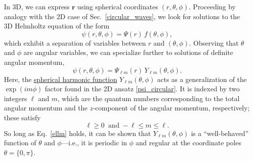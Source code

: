\documentclass[pra,12pt]{revtex4-2}
\begin{document}
In 3D, we can express $\mathbf{r}$ using spherical coordinates $(r,
\theta, \phi)$.  Proceeding by analogy with the 2D case of
Sec.~\ref{circular_waves}, we look for solutions to the 3D Helmholtz
equation of the form
\begin{equation}
  \psi(r,\theta,\phi) = \Psi(r) \, f(\theta, \phi),
  \label{psi3d0}
\end{equation}
which exhibit a separation of variables between $r$ and
$(\theta,\phi)$.  Observing that $\theta$ and $\phi$ are angular
variables, we can specialize further to solutions of definite angular
momentum,
\begin{equation}
  \psi(r,\theta,\phi) = \Psi_{\ell m}(r) \,Y_{\ell m}(\theta, \phi).
  \label{psi3d}
\end{equation}
Here, the
\href{https://docs.scipy.org/doc/scipy/reference/generated/scipy.special.sph_harm.html}{spherical
  harmonic function} $Y_{\ell m}(\theta,\phi)$ acts as a
generalization of the $\exp(im\phi)$ factor found in the 2D ansatz
\eqref{psi_circular}.  It is indexed by two integers $\ell$ and $m$,
which are the quantum numbers corresponding to the total angular
momentum and the $z$-component of the angular momentum, respectively;
these satisfy
\begin{equation}
  \ell \ge 0 \;\;\mathrm{and}\; -\ell\le m \le \ell.
  \label{ellm}
\end{equation}
So long as Eq.~\eqref{ellm} holds, it can be shown that $Y_{\ell
  m}(\theta,\phi)$ is a ``well-behaved'' function of $\theta$ and
$\phi$---i.e., it is periodic in $\phi$ and regular at the coordinate
poles $\theta = \{0, \pi\}$.
\end{document}
